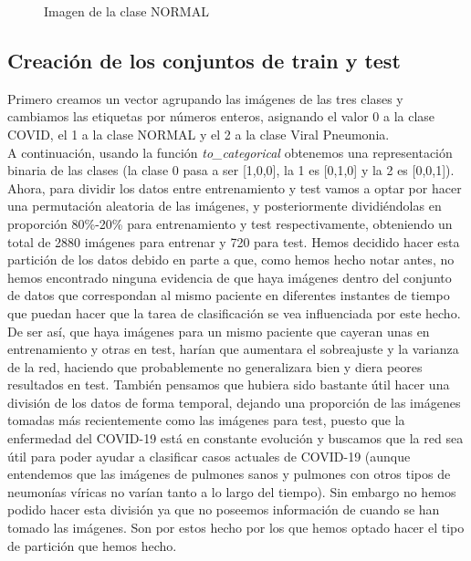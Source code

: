 \documentclass[11pt,a4paper]{article}
\theoremstyle{definition}
\begin{document}
\begin{figure}[H]
\begin{minipage}[b]{0.25\textwidth}
	\caption{Imagen de la clase NORMAL}
  \end{minipage}
\end{figure}


\subsection{Creación de los conjuntos de train y test}

Primero creamos un vector agrupando las imágenes de las tres clases y cambiamos las etiquetas por números enteros, asignando el valor 0 a la clase COVID, el 1 a la clase NORMAL y el 2 a la clase Viral Pneumonia.\\

A continuación, usando la función \textit{to\_categorical} obtenemos una representación binaria de las clases (la clase 0 pasa a ser [1,0,0], la 1 es [0,1,0] y la 2 es [0,0,1]).\\

Ahora, para dividir los datos entre entrenamiento y test vamos a optar por hacer una permutación aleatoria de las imágenes, y posteriormente dividiéndolas en proporción 80\%-20\% para entrenamiento y test respectivamente, obteniendo un total de 2880 imágenes para entrenar y 720 para test. Hemos decidido hacer esta partición de los datos debido en parte a que, como hemos hecho notar antes, no hemos encontrado ninguna evidencia de que haya imágenes dentro del conjunto de datos que correspondan al mismo paciente en diferentes instantes de tiempo que puedan hacer que la tarea de clasificación se vea influenciada por este hecho. De ser así, que haya imágenes para un mismo paciente que cayeran unas en entrenamiento y otras en test, harían que aumentara el sobreajuste y la varianza de la red, haciendo que probablemente no generalizara bien y diera peores resultados en test. También pensamos que hubiera sido bastante útil hacer una división de los datos de forma temporal, dejando una proporción de las imágenes tomadas más recientemente como las imágenes para test, puesto que la enfermedad del COVID-19 está en constante evolución y buscamos que la red sea útil para poder ayudar a clasificar casos actuales de COVID-19 (aunque entendemos que las imágenes de pulmones sanos y pulmones con otros tipos de neumonías víricas no varían tanto a lo largo del tiempo). Sin embargo no hemos podido hacer esta división ya que no poseemos información de cuando se han tomado las imágenes. Son por estos hecho por los que hemos optado hacer el tipo de partición que hemos hecho.
\end{document}
